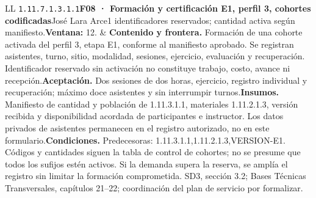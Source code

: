 \begin{longtable}{L{\tabcolsep\relax}L{\tabcolsep\relax}}
\texttt{1.\allowbreak{}11.\allowbreak{}7.\allowbreak{}1.\allowbreak{}3.\allowbreak{}1.\allowbreak{}1}\newline{}\textbf{F08 · Formación y certificación E1, perfil 3, cohortes codificadas}\newline{}José Lara Arce\newline{}1 identificadores reservados; cantidad activa según manifiesto.\newline{}\textbf{Ventana:} 12. & \textbf{Contenido y frontera.} Formación de una cohorte activada del perfil 3, etapa E1, conforme al manifiesto aprobado. Se registran asistentes, turno, sitio, modalidad, sesiones, ejercicio, evaluación y recuperación. Identificador reservado sin activación no constituye trabajo, costo, avance ni recepción.\newline{}\textbf{Aceptación.} Dos sesiones de dos horas, ejercicio, registro individual y recuperación; máximo doce asistentes y sin interrumpir turnos.\newline{}\textbf{Insumos.} Manifiesto de cantidad y población de 1.11.3.1.1, materiales 1.11.2.1.3, versión recibida y disponibilidad acordada de participantes e instructor. Los datos privados de asistentes permanecen en el registro autorizado, no en este formulario.\newline{}\textbf{Condiciones.} Predecesoras: 1.11.3.1.1,1.11.2.1.3,VERSION-E1. Códigos y cantidades siguen la tabla de control de cohortes; no se presume que todos los sufijos estén activos. Si la demanda supera la reserva, se amplía el registro sin limitar la formación comprometida. SD3, sección 3.2; Bases Técnicas Transversales, capítulos 21--22; coordinación del plan de servicio por formalizar.\\\hline

\end{longtable}
